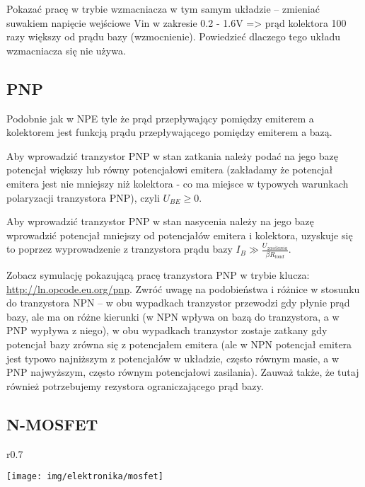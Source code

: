 \begin{teacherOnly}
Pokazać pracę w trybie wzmacniacza w tym samym układzie – zmieniać suwakiem napięcie wejściowe Vin w zakresie 0.2 - 1.6V => prąd kolektora 100 razy większy od prądu bazy (wzmocnienie).
Powiedzieć dlaczego tego układu wzmacniacza się nie używa.
\end{teacherOnly}

\subsection{PNP}
Podobnie jak w NPE tyle że prąd przepływający pomiędzy emiterem a kolektorem jest funkcją prądu przepływającego pomiędzy emiterem a bazą.

Aby wprowadzić tranzystor PNP w stan zatkania należy podać na jego bazę potencjał większy lub równy potencjałowi emitera (zakładamy że potencjał emitera jest nie mniejszy niż kolektora - co ma miejsce w typowych warunkach polaryzacji tranzystora PNP), czyli $U_{BE} \geq 0$.

Aby wprowadzić tranzystor PNP w stan nasycenia należy na jego bazę wprowadzić potencjał mniejszy od potencjałów emitera i kolektora, uzyskuje się to poprzez wyprowadzenie z tranzystora prądu bazy $I_B \gg \frac{U_{zasilania}}{\beta R_{load}}$.

Zobacz symulację pokazującą pracę tranzystora PNP w trybie klucza: \url{http://ln.opcode.eu.org/pnp}.
Zwróć uwagę na podobieństwa i różnice w stosunku do tranzystora NPN –
	w obu wypadkach tranzystor przewodzi gdy płynie prąd bazy, ale ma on różne kierunki (w NPN wpływa on bazą do tranzystora, a w PNP wypływa z niego),
	w obu wypadkach tranzystor zostaje zatkany gdy potencjał bazy zrówna się z potencjałem emitera (ale w NPN potencjał emitera jest typowo najniższym z potencjałów w układzie, często równym masie, a w PNP najwyższym, często równym potencjałowi zasilania).
Zauważ także, że tutaj również potrzebujemy rezystora ograniczającego prąd bazy.

\subsection{N-MOSFET}

\begin{wrapfigure}{r}{0.7\textwidth}
  \begin{center}
    \vspace{-40pt}
    \texttt{[image: img/elektronika/mosfet]}
    \vspace{-20pt}
  \end{center}
\end{wrapfigure}

